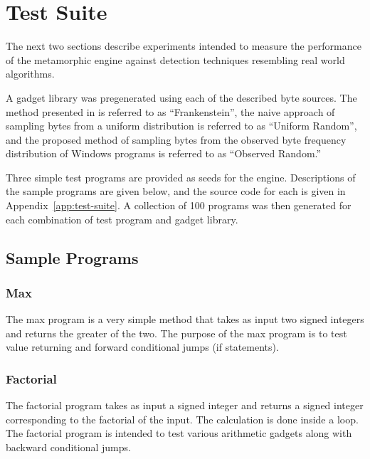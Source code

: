 \section{Test Suite}

    The next two sections describe experiments intended to measure the
    performance of the metamorphic engine against detection techniques
    resembling real world algorithms.

    A gadget library was pregenerated using each of the described byte
    sources.  The method presented in \cite{franken} is referred to as
    ``Frankenstein'', the naive approach of sampling bytes from a uniform
    distribution is referred to as ``Uniform Random'', and the proposed
    method of sampling bytes from the observed byte frequency distribution
    of Windows programs is referred to as ``Observed Random.''

    Three simple test programs are provided as seeds for the engine.
    Descriptions of the sample programs are given below, and the source code
    for each is given in Appendix~\ref{app:test-suite}. A
    collection of 100 programs was then generated for each combination of
    test program and gadget library.
    
    \subsection{Sample Programs}

        \subsubsection{Max}

            The max program is a very simple method that takes as input two
            signed integers and returns the greater of the two. The purpose
            of the max program is to test value returning and forward
            conditional jumps (if statements).

        \subsubsection{Factorial}

            The factorial program takes as input a signed integer and
            returns a signed integer corresponding to the factorial of the
            input. The calculation is done inside a loop. The factorial
            program is intended to test various arithmetic gadgets along
            with backward conditional jumps.

